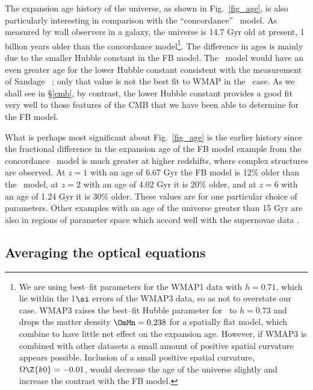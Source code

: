 \documentclass[12pt]{iopart}
\begin{document}
The expansion age history of the universe, as shown in Fig.~\ref{fig_age},
is also particularly interesting in comparison with the ``concordance''
\LCDM\ model. As measured by wall observers in a galaxy, the universe is
14.7 Gyr old at present, 1 billion years older than the concordance
model\footnote{We are using best--fit parameters for the WMAP1 data with
$h=0.71$, which lie within the 1$\si$ errors of the WMAP3 data, so as not to
overstate our case. WMAP3 raises the best--fit Hubble parameter for \LCDM\
to $h=0.73$ and drops the matter density $\OmMn=0.238$ for a spatially flat
model, which combine to have little net effect on the expansion age. However,
if WMAP3 is combined with other datasets a small amount of positive spatial
curvature appears possible. Inclusion of a small positive spatial curvature,
$\Omega\Z{k0}=-0.01$, would decrease the age of the universe
slightly and increase the contrast with the FB model.}.
The difference in ages is mainly due to the smaller Hubble constant in
the FB model. The \LCDM\ model would have an even greater age for the lower
Hubble constant consistent with the measurement of Sandage \etal\
\cite{Sandage}; only that value is not the best fit to WMAP in the
\LCDM\ case. As we shall see in \S\ref{cmb}, by contrast, the lower Hubble
constant provides a good fit very well to those features of the CMB that
we have been able to determine for the FB model.

What is perhaps most significant about Fig.\ \ref{fig_age} is the earlier
history since the fractional difference in the expansion age of the FB model
example from the concordance \LCDM\ model is much greater at higher redshifts,
where complex structures are observed. At $z=1$ with an age of 6.67 Gyr the
FB model is 12\% older than the \LCDM\ model, at $z=2$ with an age of 4.02
Gyr it is 20\% older, and at $z=6$ with an age of 1.24 Gyr it is 30\% older.
These values are for one particular choice of parameters. Other examples with
an age of the universe greater than 15 Gyr are also in regions of parameter
space which accord well with the supernovae data \cite{paper2}.

\subsection{Averaging the optical equations\label{nullav}}
\end{document}
